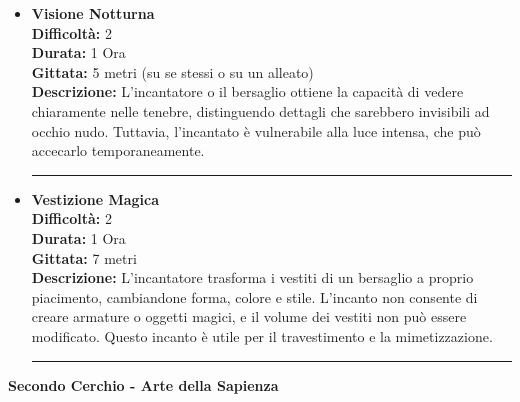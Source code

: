 \documentclass[./magie.tex]{subfiles}
\begin{document}
\begin{itemize}
\item \textbf{Visione Notturna} \\
\textbf{Difficoltà:} 2 \\
\textbf{Durata:} 1 Ora \\
\textbf{Gittata:} 5 metri (su se stessi o su un alleato) \\
\textbf{Descrizione:} L'incantatore o il bersaglio ottiene la capacità di vedere chiaramente nelle tenebre, distinguendo dettagli che sarebbero invisibili ad occhio nudo. Tuttavia, l'incantato è vulnerabile alla luce intensa, che può accecarlo temporaneamente.

\vspace{0.2cm}
\noindent
\begin{center}
\rule{\textwidth}{0.4pt} 
\end{center}
\vspace{0.2cm}

\item \textbf{Vestizione Magica} \\
\textbf{Difficoltà:} 2 \\
\textbf{Durata:} 1 Ora \\
\textbf{Gittata:} 7 metri \\
\textbf{Descrizione:} L'incantatore trasforma i vestiti di un bersaglio a proprio piacimento, cambiandone forma, colore e stile. L'incanto non consente di creare armature o oggetti magici, e il volume dei vestiti non può essere modificato. Questo incanto è utile per il travestimento e la mimetizzazione.

\vspace{0.2cm}
\noindent
\begin{center}
\rule{\textwidth}{0.4pt} 
\end{center}
\vspace{0.2cm}

\end{itemize}
\clearpage
\vspace{0.2cm}
{\zarafirtitlefont\Large\bfseries Secondo Cerchio - Arte della Sapienza}
\end{document}
